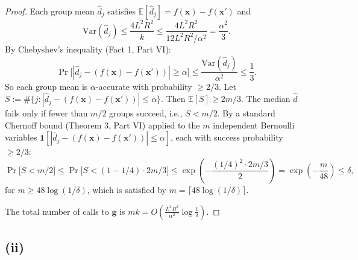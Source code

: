 \begin{proof}
Each group mean $\hat{d}_j$ satisfies $\mathbb{E}[\hat{d}_j] = f(\mathbf{x}) - f(\mathbf{x}')$ and
\[
\mathrm{Var}(\hat{d}_j) \leq \frac{4L^2R^2}{k} \leq \frac{4L^2R^2}{12L^2R^2/\alpha^2} = \frac{\alpha^2}{3}.
\]
By Chebyshev's inequality (Fact 1, Part VI):
\[
\Pr\bigl[|\hat{d}_j - (f(\mathbf{x}) - f(\mathbf{x}'))| \geq \alpha\bigr] \leq \frac{\mathrm{Var}(\hat{d}_j)}{\alpha^2} \leq \frac{1}{3}.
\]
So each group mean is $\alpha$-accurate with probability $\geq 2/3$. Let $S := \#\{j : |\hat{d}_j - (f(\mathbf{x})-f(\mathbf{x}'))| \leq \alpha\}$. Then $\mathbb{E}[S] \geq 2m/3$. The median $\hat{d}$ fails only if fewer than $m/2$ groups succeed, i.e., $S < m/2$. By a standard Chernoff bound (Theorem 3, Part VI) applied to the $m$ independent Bernoulli variables $\mathbf{1}[|\hat{d}_j - (f(\mathbf{x})-f(\mathbf{x}'))| \leq \alpha]$, each with success probability $\geq 2/3$:
\[
\Pr\bigl[S < m/2\bigr] \leq \Pr\bigl[S < (1 - 1/4) \cdot 2m/3\bigr] \leq \exp\!\left(-\frac{(1/4)^2 \cdot 2m/3}{2}\right) = \exp\!\left(-\frac{m}{48}\right) \leq \delta,
\]
for $m \geq 48\log(1/\delta)$, which is satisfied by $m = \lceil 48\log(1/\delta) \rceil$.

The total number of calls to $\mathbf{g}$ is $mk = O\!\left(\frac{L^2R^2}{\alpha^2}\log\frac{1}{\delta}\right)$.
\end{proof}

\subsection*{(ii)}

